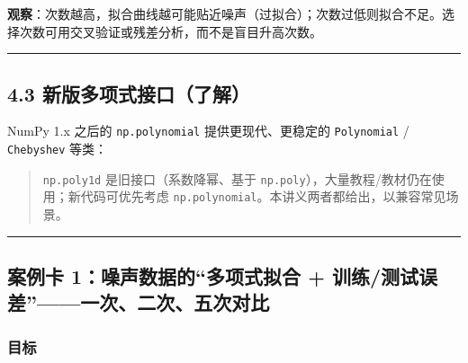 \textbf{观察}：次数越高，拟合曲线越可能贴近噪声（过拟合）；次数过低则拟合不足。选择次数可用交叉验证或残差分析，而不是盲目升高次数。

\begin{center}\rule{0.5\linewidth}{0.5pt}\end{center}

\subsection{4.3
新版多项式接口（了解）}\label{ux65b0ux7248ux591aux9879ux5f0fux63a5ux53e3ux4e86ux89e3}

NumPy 1.x 之后的 \texttt{np.polynomial} 提供更现代、更稳定的
\texttt{Polynomial} / \texttt{Chebyshev} 等类：

\begin{Shaded}
\begin{Highlighting}[]
\OperatorTok{=}\NormalTok{ Polynomial([}\NormalTok{, }\NormalTok{, }\NormalTok{])     }
\NormalTok{))                   }
\end{Highlighting}
\end{Shaded}

\begin{quote}
\texttt{np.poly1d} 是旧接口（系数降幂、基于
\texttt{np.poly}），大量教程/教材仍在使用；新代码可优先考虑
\texttt{np.polynomial}。本讲义两者都给出，以兼容常见场景。
\end{quote}

\begin{center}\rule{0.5\linewidth}{0.5pt}\end{center}

\subsection{案例卡 1：噪声数据的``多项式拟合 +
训练/测试误差''------一次、二次、五次对比}\label{ux6848ux4f8bux5361-1ux566aux58f0ux6570ux636eux7684ux591aux9879ux5f0fux62dfux5408-ux8badux7ec3ux6d4bux8bd5ux8befux5deeux4e00ux6b21ux4e8cux6b21ux4e94ux6b21ux5bf9ux6bd4}

\subsubsection{目标}\label{ux76eeux6807-8}

